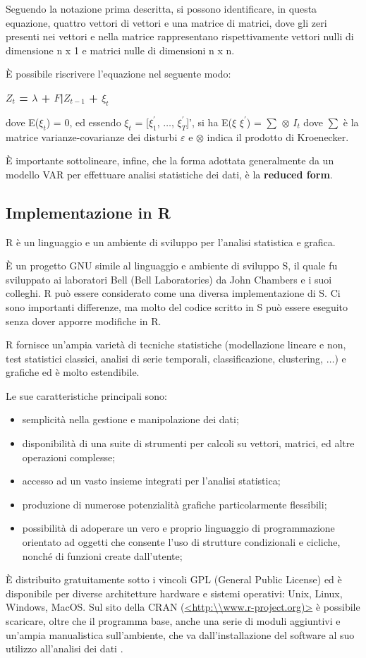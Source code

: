 \documentclass[12pt,a4paper,oneside,openright]{book}
\begin{document}
Seguendo la notazione prima descritta, si possono identificare, in questa equazione, quattro vettori di vettori e una matrice di matrici, dove gli zeri presenti nei vettori e nella matrice rappresentano rispettivamente vettori nulli di dimensione n x 1 e matrici nulle di dimensioni n x n. 

È possibile riscrivere l'equazione nel seguente modo: 
\begin{center}
{\bfseries
$Z_t$ = $\lambda$ + $F$|$Z_{t-1}$ + $\xi_t$
}
\end{center}
dove E($\xi_t$) = 0, ed essendo $\xi_t$ = [$\xi^{'}_1$, $\dots$, $\xi^{'}_T$]', si ha E($\xi$ $\xi^{'}$) = $\sum$ $\otimes$ $I_t$ dove $\sum$ è la matrice varianze-covarianze dei disturbi $\varepsilon$ e $\otimes$ indica il prodotto di Kroenecker.
\medskip

È importante sottolineare, infine, che la forma adottata generalmente da un modello VAR per effettuare analisi statistiche dei dati, è la {\bfseries reduced form}.
\newpage
\subsection{Implementazione in R}
R è un linguaggio e un ambiente di sviluppo per l'analisi statistica e grafica.

È un progetto GNU simile al linguaggio e ambiente di sviluppo S, il quale fu sviluppato ai laboratori Bell (Bell Laboratories) da John Chambers e i suoi colleghi. R può essere considerato come una diversa implementazione di S. Ci sono importanti differenze, ma molto del codice scritto in S può essere eseguito senza dover apporre modifiche in R. 

R fornisce un'ampia varietà di tecniche statistiche (modellazione lineare e non, test statistici classici, analisi di serie temporali, classificazione, clustering, $\dots$) e grafiche ed è molto estendibile. 

Le sue caratteristiche principali sono:
\begin{itemize}
\item semplicità nella gestione e manipolazione dei dati;
\item disponibilità di una suite di strumenti per calcoli su vettori, matrici, ed altre operazioni complesse;
\item accesso ad un vasto insieme integrati per l'analisi statistica;
\item produzione di numerose potenzialità grafiche particolarmente flessibili;
\item possibilità di adoperare un vero e proprio linguaggio di programmazione orientato ad oggetti che consente l'uso di strutture condizionali e cicliche, nonché di funzioni create dall'utente;
\end{itemize}
È distribuito gratuitamente sotto i vincoli GPL (General Public License) ed è disponibile per diverse architetture hardware e sistemi operativi: Unix, Linux, Windows, MacOS. Sul sito della  CRAN (\url{<http:\\www.r-project.org)>} è possibile scaricare, oltre che il programma base, anche una serie di moduli aggiuntivi e un'ampia manualistica sull'ambiente, che va dall'installazione del software al suo utilizzo all'analisi dei dati \cite{12a}.
\end{document}
